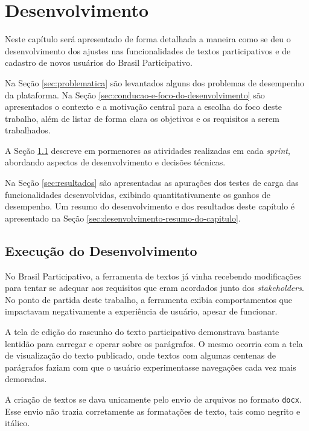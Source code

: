 \chapter {Desenvolvimento}

Neste capítulo será apresentado de forma detalhada a maneira como se deu o desenvolvimento dos ajustes nas funcionalidades de textos participativos e de cadastro de novos usuários do Brasil Participativo.

Na Seção \ref{sec:problematica} são levantados alguns dos problemas de desempenho da plataforma.
Na Seção \ref{sec:conducao-e-foco-do-desenvolvimento} são apresentados o contexto e a motivação central para a escolha do foco deste trabalho, além de listar de forma clara os objetivos e os requisitos a serem trabalhados.

A Seção \ref{sec:etapas-de-desenvolvimento} descreve em pormenores as atividades realizadas em cada \textit{sprint}, abordando aspectos de desenvolvimento e decisões técnicas.

Na Seção \ref{sec:resultados} são apresentadas as apurações dos testes de carga das funcionalidades desenvolvidas, exibindo quantitativamente os ganhos de desempenho.
Um resumo do desenvolvimento e dos resultados deste capítulo é apresentado na Seção \ref{sec:desenvolvimento-resumo-do-capitulo}.




\section {Execução do Desenvolvimento}
\label{sec:etapas-de-desenvolvimento}

No Brasil Participativo, a ferramenta de textos já vinha recebendo modificações para tentar se adequar aos requisitos que eram acordados junto dos \textit{stakeholders}. No ponto de partida deste trabalho, a ferramenta exibia comportamentos que impactavam negativamente a experiência de usuário, apesar de funcionar.

A tela de edição do rascunho do texto participativo demonstrava bastante lentidão para carregar e operar sobre os parágrafos. O mesmo ocorria com a tela de visualização do texto publicado, onde textos com algumas centenas de parágrafos faziam com que o usuário experimentasse navegações cada vez mais demoradas.

A criação de textos se dava unicamente pelo envio de arquivos no formato \texttt{docx}.
Esse envio não trazia corretamente as formatações de texto, tais como negrito e itálico.

